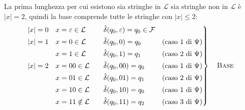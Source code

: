 \documentclass[a4paper, 11pt, oneside]{book}
\theoremstyle{formale}
\begin{document}
    La prima lunghezza per cui esistono sia stringhe in $\mathcal{L}$ sia stringhe non in
    $\mathcal{L}$ \`e $|x| = 2$, quindi la base comprende tutte le stringhe con
    $|x| \leq 2$:
    \begin{equation*}
        \left.
        \begin{alignedat}{3}
            |x| = 0 \quad & x = \varepsilon \in \mathcal{L} & \qquad
                & \hat{\delta}(q_0, \varepsilon) = q_0 \in \mathcal{F} & & \\
            |x| = 1 \quad & x = 0 \in \mathcal{L} &
                & \hat{\delta}(q_0, 0) = q_0
                &\quad & \text{(caso 1 di $\Psi$)} \\
            & x = 1 \in \mathcal{L} &
                & \hat{\delta}(q_0, 1) = q_1
                && \text{(caso 2 di $\Psi$)} \\
            |x| = 2 \quad & x = 00 \in \mathcal{L} &
                & \hat{\delta}(q_0, 00) = q_0
                && \text{(caso 1 di $\Psi$)} \\
            & x = 01 \in \mathcal{L} &
                & \hat{\delta}(q_0, 01) = q_1
                && \text{(caso 2 di $\Psi$)} \\
            & x = 10 \in \mathcal{L} &
                & \hat{\delta}(q_0, 10) = q_0
                && \text{(caso 1 di $\Psi$)} \\
            & x = 11 \notin \mathcal{L} &
                & \hat{\delta}(q_0, 11) = q_2
                && \text{(caso 3 di $\Psi$)}
        \end{alignedat}
        \right\}
        \quad \text{\textsc{Base}}
    \end{equation*}
\end{document}

